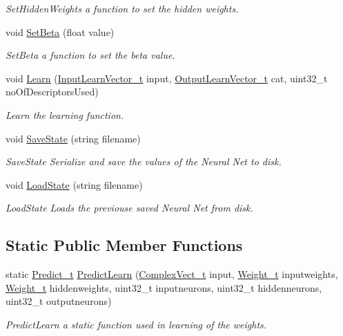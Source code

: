 \begin{DoxyCompactItemize}
\begin{DoxyCompactList}\small\item\em Set\+Hidden\+Weights a function to set the hidden weights. \end{DoxyCompactList}\item 
void \hyperlink{class_soil_math_1_1_n_n_a5a73fdf65b39d81b6185de3a3b315cdb}{Set\+Beta} (float value)
\begin{DoxyCompactList}\small\item\em Set\+Beta a function to set the beta value. \end{DoxyCompactList}\item 
void \hyperlink{class_soil_math_1_1_n_n_a8550b524ed096712bb2fad9fa57b8c8d}{Learn} (\hyperlink{_soil_math_types_8h_a45aa81992bf0ddf272907bd4fa0b96cf}{Input\+Learn\+Vector\+\_\+t} input, \hyperlink{_soil_math_types_8h_a2d8b5a261688166d724b68addd8561e6}{Output\+Learn\+Vector\+\_\+t} cat, uint32\+\_\+t no\+Of\+Descriptors\+Used)
\begin{DoxyCompactList}\small\item\em Learn the learning function. \end{DoxyCompactList}\item 
void \hyperlink{class_soil_math_1_1_n_n_ac01bcc755578095ebf1f1f0e951f2678}{Save\+State} (string filename)
\begin{DoxyCompactList}\small\item\em Save\+State Serialize and save the values of the Neural Net to disk. \end{DoxyCompactList}\item 
void \hyperlink{class_soil_math_1_1_n_n_a69c00e336b11531e25d51262da10fea0}{Load\+State} (string filename)
\begin{DoxyCompactList}\small\item\em Load\+State Loads the previouse saved Neural Net from disk. \end{DoxyCompactList}\end{DoxyCompactItemize}
\subsection*{Static Public Member Functions}
\begin{DoxyCompactItemize}
\item 
static \hyperlink{_soil_math_types_8h_aaeba766195a440b2539f0438d3d41f95}{Predict\+\_\+t} \hyperlink{class_soil_math_1_1_n_n_ac758bdef758439af30a62c486dff79ca}{Predict\+Learn} (\hyperlink{_soil_math_types_8h_a7567e521c2b2c408dcb62dbff72390f7}{Complex\+Vect\+\_\+t} input, \hyperlink{_soil_math_types_8h_ac56ad2b88186620fd0de0d213aa715dd}{Weight\+\_\+t} inputweights, \hyperlink{_soil_math_types_8h_ac56ad2b88186620fd0de0d213aa715dd}{Weight\+\_\+t} hiddenweights, uint32\+\_\+t inputneurons, uint32\+\_\+t hiddenneurons, uint32\+\_\+t outputneurons)
\begin{DoxyCompactList}\small\item\em Predict\+Learn a static function used in learning of the weights. \end{DoxyCompactList}\end{DoxyCompactItemize}
